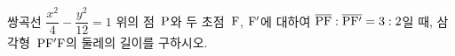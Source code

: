 쌍곡선 $\dfrac{x^2}{4}-\dfrac{y^2}{12}=1$ 위의 점~$\mathrm{P}$와 두 초점~$\mathrm{F}$, $\mathrm{F'}$에 대하여 $\overline{\mathrm{PF}}:\overline{\mathrm{PF'}}=3:2$일 때, 삼각형~$\mathrm{PF'F}$의 둘레의 길이를 구하시오.
